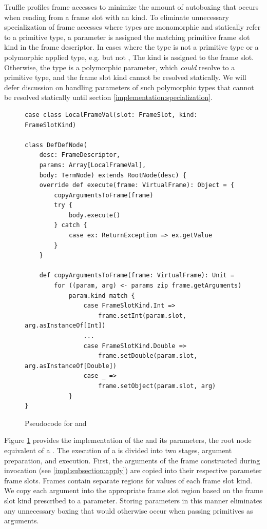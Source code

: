 Truffle profiles frame accesses to minimize the amount of autoboxing that occurs when reading from a frame slot with an  kind. 
To eliminate unnecessary specialization of frame accesses where types are monomorphic and statically refer to a primitive type, a parameter is assigned the matching primitive frame slot kind in the frame descriptor. 
In cases where the type is not a primitive type or a polymorphic applied type, e.g.  but not , The  kind is assigned to the frame slot.
Otherwise, the type is a polymorphic parameter, which \textit{could} resolve to a primitive type, and the frame slot kind cannot be resolved statically.
We will defer discussion on handling parameters of such polymorphic types that cannot be resolved statically until section \ref{implementation:specialization}.

\begin{figure}[!htb]
\begin{verbatim}
case class LocalFrameVal(slot: FrameSlot, kind: FrameSlotKind)
	
class DefDefNode(
	desc: FrameDescriptor, 
	params: Array[LocalFrameVal], 
	body: TermNode) extends RootNode(desc) {
	override def execute(frame: VirtualFrame): Object = {
		copyArgumentsToFrame(frame)
		try {
			body.execute()
		} catch {
			case ex: ReturnException => ex.getValue
		}
	}	
		
	def copyArgumentsToFrame(frame: VirtualFrame): Unit = 
		for ((param, arg) <- params zip frame.getArguments) 
			param.kind match {
				case FrameSlotKind.Int =>
					frame.setInt(param.slot, arg.asInstanceOf[Int])
				...
				case FrameSlotKind.Double =>
					frame.setDouble(param.slot, arg.asInstanceOf[Double])	
				case _ =>
					frame.setObject(param.slot, arg)
			}
}
\end{verbatim}
\caption{Pseudocode for  and }
\label{impl:defdefnode}
\end{figure}

Figure \ref{impl:defdefnode} provides the implementation of the  and its parameters, the root node equivalent of a .
The execution of a  is divided into two stages, argument preparation, and execution.
First, the arguments of the frame constructed during invocation (see \ref{impl:subsection:apply}) are copied into their respective parameter frame slots.
Frames contain separate regions for values of each frame slot kind.
We copy each argument into the appropriate frame slot region based on the frame slot kind prescribed to a parameter.
Storing parameters in this manner eliminates any unnecessary boxing that would otherwise occur when passing primitives as arguments.


